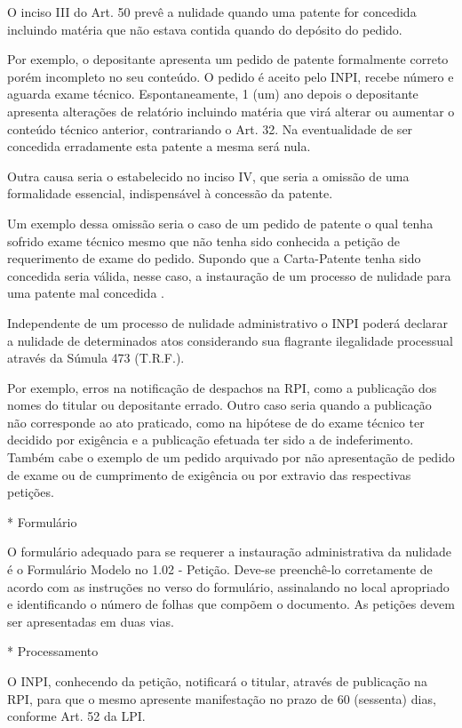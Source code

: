 \documentclass[12pt]{article}
\begin{document}
 O inciso III do Art. 50 prevê a nulidade quando uma patente for
 concedida incluindo matéria que não estava contida quando do depósito
 do pedido.
 
 Por exemplo, o depositante apresenta um pedido de patente formalmente
 correto porém incompleto no seu conteúdo. O pedido é aceito pelo
 INPI, recebe número e aguarda exame técnico. Espontaneamente, 1 (um)
 ano depois o depositante apresenta alterações de relatório incluindo
 matéria que virá alterar ou aumentar o conteúdo técnico anterior,
 contrariando o Art. 32. Na eventualidade de ser concedida erradamente
 esta patente a mesma será nula.
 
 Outra causa seria o estabelecido no inciso IV, que seria a omissão de
 uma formalidade essencial, indispensável à concessão da patente.
 
 Um exemplo dessa omissão seria o caso de um pedido de patente o qual
 tenha sofrido exame técnico mesmo que não tenha sido conhecida a
 petição de requerimento de exame do pedido. Supondo que a
 Carta-Patente tenha sido concedida seria válida, nesse caso, a
 instauração de um processo de nulidade para uma patente mal concedida
 .
 
 Independente de um processo de nulidade administrativo o INPI poderá
 declarar a nulidade de determinados atos considerando sua flagrante
 ilegalidade processual através da Súmula 473 (T.R.F.).
 
 Por exemplo, erros na notificação de despachos na RPI, como a
 publicação dos nomes do titular ou depositante errado. Outro caso
 seria quando a publicação não corresponde ao ato praticado, como na
 hipótese de do exame técnico ter decidido por exigência e a
 publicação efetuada ter sido a de indeferimento. Também cabe o
 exemplo de um pedido arquivado por não apresentação de pedido de
 exame ou de cumprimento de exigência ou por extravio das respectivas
 petições.

     * Formulário
     
     O formulário adequado para se requerer a instauração
     administrativa da nulidade é o Formulário Modelo no 1.02 -
     Petição. Deve-se preenchê-lo corretamente de acordo com as
     instruções no verso do formulário, assinalando no local
     apropriado e identificando o número de folhas que compõem o
     documento. As petições devem ser apresentadas em duas vias.

     * Processamento
     
     O INPI, conhecendo da petição, notificará o titular, através de
     publicação na RPI, para que o mesmo apresente manifestação no
     prazo de 60 (sessenta) dias, conforme Art. 52 da LPI.
     
\end{document}
